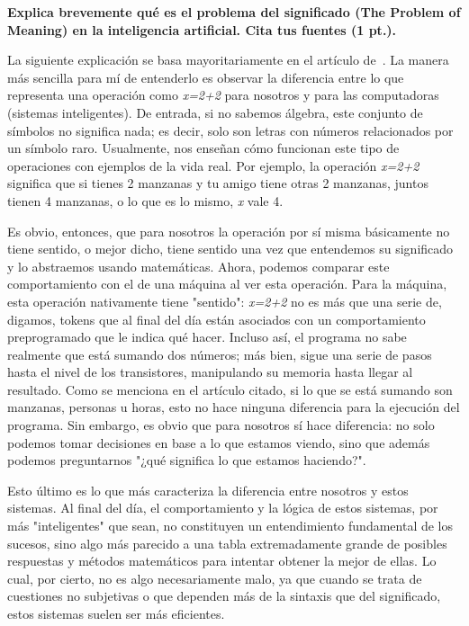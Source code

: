 \textbf{Explica brevemente qué es el problema del significado (The Problem of Meaning) en la inteligencia artificial. Cita tus fuentes (1 pt.).}\vspace{.3cm}

La siguiente explicación se basa mayoritariamente en el artículo de~\cite{philosophies4020014}. La manera más sencilla para mí de entenderlo es observar la diferencia entre lo que representa una operación como \textit{x=2+2} para nosotros y para las computadoras (sistemas inteligentes). De entrada, si no sabemos álgebra, este conjunto de símbolos no significa nada; es decir, solo son letras con números relacionados por un símbolo raro. Usualmente, nos enseñan cómo funcionan este tipo de operaciones con ejemplos de la vida real. Por ejemplo, la operación \textit{x=2+2} significa que si tienes 2 manzanas y tu amigo tiene otras 2 manzanas, juntos tienen 4 manzanas, o lo que es lo mismo, \textit{x} vale 4.\vspace{.3cm}

Es obvio, entonces, que para nosotros la operación por sí misma básicamente no tiene sentido, o mejor dicho, tiene sentido una vez que entendemos su significado y lo abstraemos usando matemáticas. Ahora, podemos comparar este comportamiento con el de una máquina al ver esta operación. Para la máquina, esta operación nativamente tiene "sentido": \textit{x=2+2} no es más que una serie de, digamos, tokens que al final del día están asociados con un comportamiento preprogramado que le indica qué hacer. Incluso así, el programa no sabe realmente que está sumando dos números; más bien, sigue una serie de pasos hasta el nivel de los transistores, manipulando su memoria hasta llegar al resultado. Como se menciona en el artículo citado, si lo que se está sumando son manzanas, personas u horas, esto no hace ninguna diferencia para la ejecución del programa. Sin embargo, es obvio que para nosotros sí hace diferencia: no solo podemos tomar decisiones en base a lo que estamos viendo, sino que además podemos preguntarnos "¿qué significa lo que estamos haciendo?".\vspace{.3cm}

Esto último es lo que más caracteriza la diferencia entre nosotros y estos sistemas. Al final del día, el comportamiento y la lógica de estos sistemas, por más "inteligentes" que sean, no constituyen un entendimiento fundamental de los sucesos, sino algo más parecido a una tabla extremadamente grande de posibles respuestas y métodos matemáticos para intentar obtener la mejor de ellas. Lo cual, por cierto, no es algo necesariamente malo, ya que cuando se trata de cuestiones no subjetivas o que dependen más de la sintaxis que del significado, estos sistemas suelen ser más eficientes.